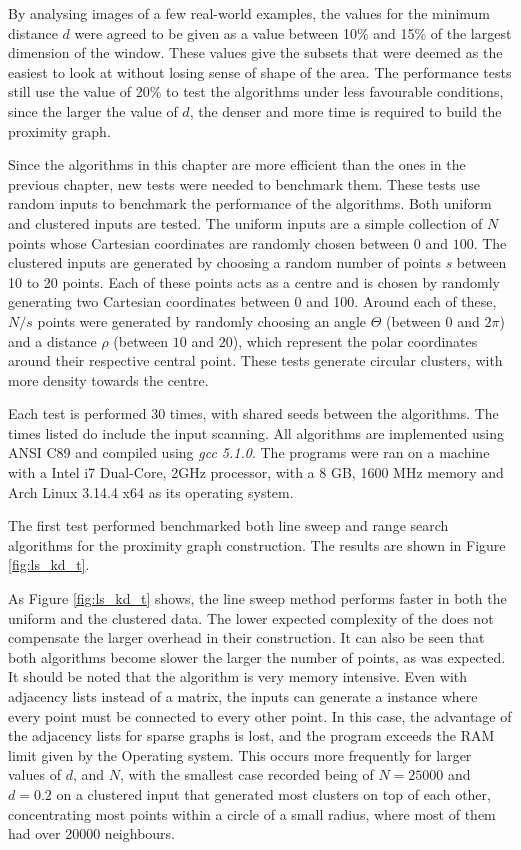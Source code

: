 
By analysing images of a few real-world examples, the values for the minimum distance $d$ were agreed to be given as a value between 10\% and 15\% of the largest dimension of the window. These values give the subsets that were deemed as the easiest to look at without losing sense of shape of the area. The performance tests still use the value of 20\% to test the algorithms under less favourable conditions, since the larger the value of $d$, the denser and more time is required to build the proximity graph. 

Since the algorithms in this chapter are more efficient than the ones in the previous chapter, new tests were needed to benchmark them. These tests use random inputs to benchmark the performance of the algorithms. Both uniform and clustered inputs are tested. The uniform inputs are a simple collection of $N$ points whose Cartesian coordinates are randomly chosen between $0$ and $100$. The clustered inputs are generated by choosing a random number of points $s$ between 10 to 20 points. Each of these points acts as a centre and is chosen by randomly generating two Cartesian coordinates between 0 and 100. Around each of these, $N/s$ points were generated by randomly choosing an angle $\Theta$ (between $0$ and $2\pi$) and a distance $\rho$ (between $10$ and $20$), which represent the polar coordinates around their respective central point. These tests generate circular clusters, with more density towards the centre.

Each test is performed 30 times, with shared seeds between the algorithms. The times listed do include the input scanning. All algorithms are implemented using ANSI C89 and compiled using \emph{gcc 5.1.0}. The programs were ran on a machine with a Intel i7 Dual-Core, 2GHz processor, with a 8 GB, 1600 MHz memory and Arch Linux 3.14.4 x64 as its operating system.

The first test performed benchmarked both line sweep and \kdtree range search algorithms for the proximity graph construction. The results are shown in Figure \ref{fig:ls_kd_t}.



As Figure \ref{fig:ls_kd_t} shows, the line sweep method performs faster in both the uniform and the clustered data. The lower expected complexity of the \kdtrees does not compensate the larger overhead in their construction. It can also be seen that both algorithms become slower the larger the number of points, as was expected. It should be noted that the algorithm is very memory intensive. Even with adjacency lists instead of a matrix, the inputs can generate a instance where every point must be connected to every other point. In this case, the advantage of the adjacency lists for sparse graphs is lost, and the program exceeds the RAM limit given by the Operating system. This occurs more frequently for larger values of $d$, and $N$, with the smallest case recorded being of $N=25000$ and $d=0.2$ on a clustered input that generated most clusters on top of each other, concentrating most points within a circle of a small radius, where most of them had over 20000 neighbours. 

